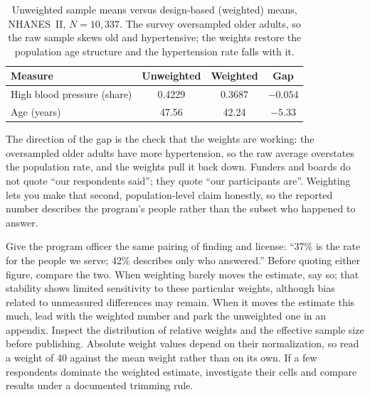 \begin{table}[htbp]
\centering
\caption[Weighted versus unweighted means, NHANES~II]{Unweighted sample means versus design-based (weighted) means, NHANES~II, $N=10{,}337$. The survey oversampled older adults, so the raw sample skews old and hypertensive; the weights restore the population age structure and the hypertension rate falls with it.}
\label{tab:weights}
{\footnotesize
\begin{tabular}{lccc}
\hline
Measure & Unweighted & Weighted & Gap \\
\hline
High blood pressure (share) & 0.4229 & 0.3687 & $-0.054$ \\
Age (years)                 & 47.56  & 42.24  & $-5.33$ \\
\hline
\end{tabular}
}
\end{table}

The direction of the gap is the check that the weights are working: the oversampled older adults have more hypertension, so the raw average overstates the population rate, and the weights pull it back down. Funders and boards do not quote \enquote{our respondents said}; they quote \enquote{our participants are}. Weighting lets you make that second, population-level claim honestly, so the reported number describes the program's people rather than the subset who happened to answer.

Give the program officer the same pairing of finding and license: \enquote{37\% is the rate for the people we serve; 42\% describes only who answered.} Before quoting either figure, compare the two. When weighting barely moves the estimate, say so; that stability shows limited sensitivity to these particular weights, although bias related to unmeasured differences may remain. When it moves the estimate this much, lead with the weighted number and park the unweighted one in an appendix. Inspect the distribution of relative weights and the effective sample size before publishing. Absolute weight values depend on their normalization, so read a weight of 40 against the mean weight rather than on its own. If a few respondents dominate the weighted estimate, investigate their cells and compare results under a documented trimming rule.

